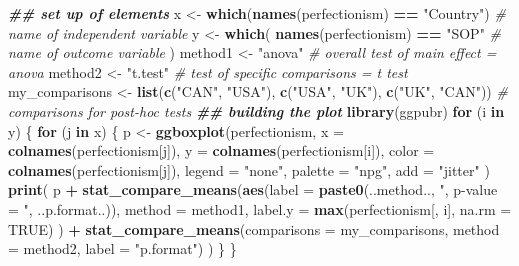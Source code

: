 \documentclass[
]{article}
\newenvironment{Shaded}{\begin{snugshade}}{\end{snugshade}}
\newcommand{\AttributeTok}[1]{\textcolor[rgb]{0.13,0.29,0.53}{#1}}
\newcommand{\CommentTok}[1]{\textcolor[rgb]{0.56,0.35,0.01}{\textit{#1}}}
\newcommand{\ConstantTok}[1]{\textcolor[rgb]{0.56,0.35,0.01}{#1}}
\newcommand{\ControlFlowTok}[1]{\textcolor[rgb]{0.13,0.29,0.53}{\textbf{#1}}}
\newcommand{\DocumentationTok}[1]{\textcolor[rgb]{0.56,0.35,0.01}{\textbf{\textit{#1}}}}
\newcommand{\FunctionTok}[1]{\textcolor[rgb]{0.13,0.29,0.53}{\textbf{#1}}}
\newcommand{\NormalTok}[1]{#1}
\newcommand{\OtherTok}[1]{\textcolor[rgb]{0.56,0.35,0.01}{#1}}
\newcommand{\SpecialCharTok}[1]{\textcolor[rgb]{0.81,0.36,0.00}{\textbf{#1}}}
\newcommand{\StringTok}[1]{\textcolor[rgb]{0.31,0.60,0.02}{#1}}
\begin{document}
\begin{Shaded}
\begin{Highlighting}[]
\DocumentationTok{\#\# set up of elements}
\NormalTok{x }\OtherTok{\textless{}{-}} \FunctionTok{which}\NormalTok{(}\FunctionTok{names}\NormalTok{(perfectionism) }\SpecialCharTok{==} \StringTok{"Country"}\NormalTok{) }\CommentTok{\# name of independent variable}
\NormalTok{y }\OtherTok{\textless{}{-}} \FunctionTok{which}\NormalTok{(}
  \FunctionTok{names}\NormalTok{(perfectionism) }\SpecialCharTok{==} \StringTok{"SOP"} \CommentTok{\# name of outcome variable}
\NormalTok{)}
\NormalTok{method1 }\OtherTok{\textless{}{-}} \StringTok{"anova"} \CommentTok{\# overall test of main effect = anova }
\NormalTok{method2 }\OtherTok{\textless{}{-}} \StringTok{"t.test"} \CommentTok{\# test of specific comparisons = t test}
\NormalTok{my\_comparisons }\OtherTok{\textless{}{-}} \FunctionTok{list}\NormalTok{(}\FunctionTok{c}\NormalTok{(}\StringTok{"CAN"}\NormalTok{, }\StringTok{"USA"}\NormalTok{), }\FunctionTok{c}\NormalTok{(}\StringTok{"USA"}\NormalTok{, }\StringTok{"UK"}\NormalTok{), }\FunctionTok{c}\NormalTok{(}\StringTok{"UK"}\NormalTok{, }\StringTok{"CAN"}\NormalTok{)) }\CommentTok{\# comparisons for post{-}hoc tests}
\DocumentationTok{\#\# building the plot}
\FunctionTok{library}\NormalTok{(ggpubr)}
\ControlFlowTok{for}\NormalTok{ (i }\ControlFlowTok{in}\NormalTok{ y) \{}
  \ControlFlowTok{for}\NormalTok{ (j }\ControlFlowTok{in}\NormalTok{ x) \{}
\NormalTok{    p }\OtherTok{\textless{}{-}} \FunctionTok{ggboxplot}\NormalTok{(perfectionism,}
      \AttributeTok{x =} \FunctionTok{colnames}\NormalTok{(perfectionism[j]), }\AttributeTok{y =} \FunctionTok{colnames}\NormalTok{(perfectionism[i]),}
      \AttributeTok{color =} \FunctionTok{colnames}\NormalTok{(perfectionism[j]),}
      \AttributeTok{legend =} \StringTok{"none"}\NormalTok{,}
      \AttributeTok{palette =} \StringTok{"npg"}\NormalTok{,}
      \AttributeTok{add =} \StringTok{"jitter"}
\NormalTok{    )}
    \FunctionTok{print}\NormalTok{(}
\NormalTok{      p }\SpecialCharTok{+} \FunctionTok{stat\_compare\_means}\NormalTok{(}\FunctionTok{aes}\NormalTok{(}\AttributeTok{label =} \FunctionTok{paste0}\NormalTok{(..method.., }\StringTok{", p{-}value = "}\NormalTok{, ..p.format..)),}
        \AttributeTok{method =}\NormalTok{ method1, }\AttributeTok{label.y =} \FunctionTok{max}\NormalTok{(perfectionism[, i], }\AttributeTok{na.rm =} \ConstantTok{TRUE}\NormalTok{)}
\NormalTok{      )}
      \SpecialCharTok{+} \FunctionTok{stat\_compare\_means}\NormalTok{(}\AttributeTok{comparisons =}\NormalTok{ my\_comparisons, }\AttributeTok{method =}\NormalTok{ method2, }\AttributeTok{label =} \StringTok{"p.format"}\NormalTok{) }
\NormalTok{    )}
\NormalTok{  \}}
\NormalTok{\}}
\end{Highlighting}
\end{Shaded}
\end{document}
